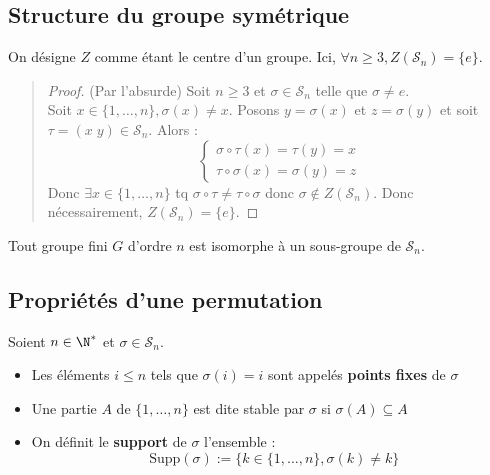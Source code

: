 \subsection{Structure du groupe symétrique}

\begin{theorem}
	On désigne $Z$ comme étant le centre d'un groupe. Ici, $\forall n \geq 3, Z(\mathcal{S}_n) = \{e\}$.
\end{theorem}

\begin{quote}
	\footnotesize
	\begin{proof}(Par l'absurde)
		Soit $n \geq 3$ et $\sigma \in \mathcal{S}_n$ telle que $ \sigma \not = e $. \\ 
		Soit $ x \in \{1,\dots,n\}, \sigma(x) \not = x$. Posons $y = \sigma(x)$ et $z = \sigma(y)$ et soit $\tau = (x \; y) \in \mathcal{S}_n$.
		Alors :
		\[
			\begin{cases}
				\sigma \circ \tau (x) = \tau(y) = x \\
				\tau \circ \sigma(x) = \sigma(y) = z 
			\end{cases} \]
		Donc $\exists x \in \{1,\dots,n\}$ tq $ \sigma \circ \tau \not = \tau \circ \sigma $ donc $ \sigma \not \in Z(\mathcal{S}_n)$.
		Donc nécessairement, $Z(\mathcal{S}_n) = \{e\}$.
	\end{proof}
	\normalsize
\end{quote}

\begin{theorem}[Cayley]
	Tout groupe fini $G$ d'ordre $n$ est isomorphe à un sous-groupe de $\mathcal{S}_n$.	
\end{theorem}

\subsection{Propriétés d'une permutation}

\begin{definition}
	Soient $n \in \N^*$ et $\sigma \in \mathcal{S}_n$.
	\begin{itemize}
		\item Les éléments $i \leq n$ tels que $\sigma(i) = i$ sont appelés \textbf{points fixes} de $\sigma$ 
		\item Une partie $A$ de $\{1,\dots,n\}$ est dite stable par $\sigma$ si $\sigma(A) \subseteq A$
		\item On définit le \textbf{support} de $\sigma$ l'ensemble : 
			\[ \boxed{ \text{ Supp} (\sigma) := \{k \in \{1,\dots,n\}, \sigma(k) \not = k \} }\]
	\end{itemize}
\end{definition}

